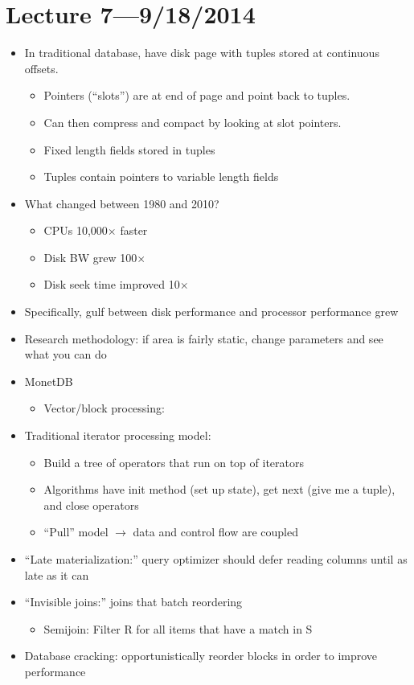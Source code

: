 \documentclass[10pt]{article}
\begin{document}
\section{Lecture 7---9/18/2014}

\begin{itemize}
\item In traditional database, have disk page with tuples stored at continuous offsets.
\begin{itemize}
\item Pointers (``slots'') are at end of page and point back to tuples.
\item Can then compress and compact by looking at slot pointers.
\item Fixed length fields stored in tuples
\item Tuples contain pointers to variable length fields
\end{itemize}
\item What changed between 1980 and 2010?
\begin{itemize}
\item CPUs 10,000$\times$ faster
\item Disk BW grew 100$\times$
\item Disk seek time improved 10$\times$
\end{itemize}
\item Specifically, gulf between disk performance and processor performance grew
\item Research methodology: if area is fairly static, change parameters and see what you can do
\item MonetDB
\begin{itemize}
\item Vector/block processing:
\end{itemize}
\item Traditional iterator processing model:
\begin{itemize}
\item Build a tree of operators that run on top of iterators
\item Algorithms have init method (set up state), get next (give me a tuple), and close operators
\item ``Pull'' model $\rightarrow$ data and control flow are coupled
\end{itemize}
\item ``Late materialization:'' query optimizer should defer reading columns until as late as it can
\item ``Invisible joins:'' joins that batch reordering
\begin{itemize}
\item Semijoin: Filter R for all items that have a match in S
\end{itemize}
\item Database cracking: opportunistically reorder blocks in order to improve performance
\end{itemize}
\end{document}
